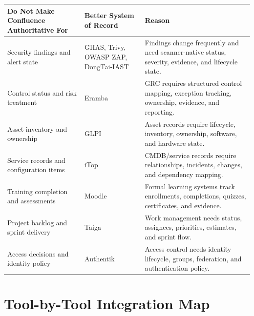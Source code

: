 \documentclass[10pt,letterpaper]{article}
\begin{document}
\begin{tabularx}{\textwidth}{L{2.15in} L{2.2in} Y}
\toprule
\textbf{Do Not Make Confluence Authoritative For} & \textbf{Better System of Record} & \textbf{Reason} \\
\midrule
Security findings and alert state & GHAS, Trivy, OWASP ZAP, DongTai-IAST & Findings change frequently and need scanner-native status, severity, evidence, and lifecycle state. \\
Control status and risk treatment & Eramba & GRC requires structured control mapping, exception tracking, ownership, evidence, and reporting. \\
Asset inventory and ownership & GLPI & Asset records require lifecycle, inventory, ownership, software, and hardware state. \\
Service records and configuration items & iTop & CMDB/service records require relationships, incidents, changes, and dependency mapping. \\
Training completion and assessments & Moodle & Formal learning systems track enrollments, completions, quizzes, certificates, and evidence. \\
Project backlog and sprint delivery & Taiga & Work management needs status, assignees, priorities, estimates, and sprint flow. \\
Access decisions and identity policy & Authentik & Access control needs identity lifecycle, groups, federation, and authentication policy. \\
\bottomrule
\end{tabularx}

\section{Tool-by-Tool Integration Map}
\end{document}
